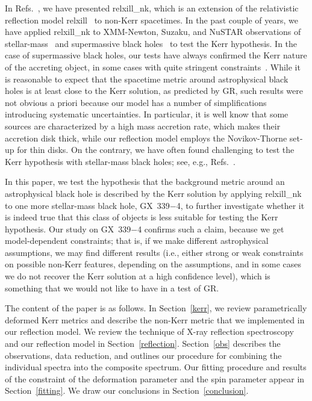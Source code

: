 \documentclass[11pt,a4paper,pdftex]{article}
\begin{document}
In Refs.~\cite{bambi2016,abdikamalov2019}, we have presented {\sc relxill\_nk}, which is an extension of the relativistic reflection model {\sc relxill}~\cite{garcia2011x,garcia2013x,garcia2014improved,dauser2010broad,dauser2013irradiation,dauser2014role} to non-Kerr spacetimes. In the past couple of years, we have applied {\sc relxill\_nk} to XMM-Newton, Suzaku, and NuSTAR observations of stellar-mass~\cite{xu2018study,zhang2019kerr,liu19nk,zhang19nk} and supermassive black holes~\cite{bh5,ashutosh,ashu1,ashu2} to test the Kerr hypothesis. In the case of supermassive black holes, our tests have always confirmed the Kerr nature of the accreting object, in some cases with quite stringent constraints~\cite{ashu1,ashu2}. While it is reasonable to expect that the spacetime metric around astrophysical black holes is at least close to the Kerr solution, as predicted by GR, such results were not obvious a priori because our model has a number of simplifications introducing systematic uncertainties. In particular, it is well know that some sources are characterized by a high mass accretion rate, which makes their accretion disk thick, while our reflection model employs the Novikov-Thorne set-up for thin disks. On the contrary, we have often found challenging to test the Kerr hypothesis with stellar-mass black holes; see, e.g., Refs.~\cite{zhang2019kerr,liu19nk,zhang19nk}.


In this paper, we test the hypothesis that the background metric around an astrophysical black hole is described by the Kerr solution by applying {\sc relxill\_nk} to one more stellar-mass black hole, GX~339$-$4, to further investigate whether it is indeed true that this class of objects is less suitable for testing the Kerr hypothesis. Our study on GX~339$-$4 confirms such a claim, because we get model-dependent constraints; that is, if we make different astrophysical assumptions, we may find different results (i.e., either strong or weak constraints on possible non-Kerr features, depending on the assumptions, and in some cases we do not recover the Kerr solution at a high confidence level), which is something that we would not like to have in a test of GR.


The content of the paper is as follows. In Section~\ref{kerr}, we review parametrically deformed Kerr metrics and describe the non-Kerr metric that we implemented in our reflection model. We review the technique of X-ray reflection spectroscopy and our reflection model in Section~\ref{reflection}. Section~\ref{obs} describes the observations, data reduction, and outlines our procedure for combining the individual spectra into the composite spectrum. Our fitting procedure and results of the constraint of the deformation parameter and the spin parameter appear in Section~\ref{fitting}. We draw our conclusions in Section~\ref{conclusion}.
\end{document}
